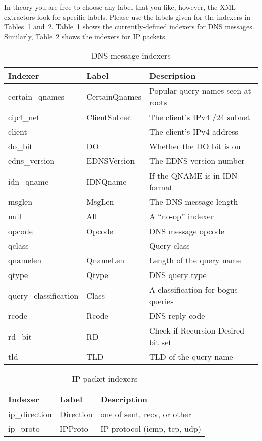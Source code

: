 \documentclass{report}
\begin{document}
In theory you are free to choose any label that you like, however,
the XML extractors look for specific labels.  Please use the labels
given for the indexers in Tables~\ref{tbl-dns-indexers}
and~\ref{tbl-ip-indexers}.  Table~\ref{tbl-dns-indexers} shows the
currently-defined indexers for DNS messages.  Similarly,
Table~\ref{tbl-ip-indexers} shows the indexers for IP packets.

\begin{table}
\label{tbl-dns-indexers}
\begin{center}
\begin{tabular}{|lll|}
\hline
Indexer & Label & Description \\
\hline 
certain\_qnames & CertainQnames & Popular query names seen at roots \\
cip4\_net & ClientSubnet & The client's IPv4 /24 subnet \\
client & - & The client's IPv4 address \\
do\_bit & DO & Whether the DO bit is on \\
edns\_version & EDNSVersion & The EDNS version number \\
idn\_qname & IDNQname & If the QNAME is in IDN format \\
msglen & MsgLen & The DNS message length \\
null & All & A ``no-op'' indexer \\
opcode & Opcode & DNS message opcode \\
qclass & - & Query class \\
qnamelen & QnameLen & Length of the query name \\
qtype & Qtype & DNS query type \\
query\_classification & Class & A classification for bogus queries \\
rcode & Rcode & DNS reply code \\
rd\_bit & RD & Check if Recursion Desired bit set \\
tld & TLD & TLD of the query name \\
\hline
\end{tabular}
\caption{DNS message indexers}
\end{center}
\end{table}

\begin{table}
\label{tbl-ip-indexers}
\begin{center}
\begin{tabular}{|lll|}
\hline
Indexer & Label & Description \\
\hline 
ip\_direction & Direction & one of sent, recv, or other \\
ip\_proto & IPProto & IP protocol (icmp, tcp, udp) \\
\hline
\end{tabular}
\caption{IP packet indexers}
\end{center}
\end{table}
\end{document}
